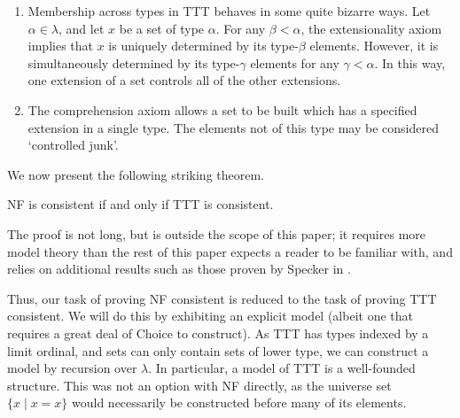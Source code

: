 \begin{remarks}\mbox{\negthinspace}
	\begin{enumerate}
		\item Membership across types in TTT behaves in some quite bizarre ways.
		Let \( \alpha \in \lambda \), and let \( x \) be a set of type \( \alpha \).
		For any \( \beta < \alpha \), the extensionality axiom implies that \( x \) is uniquely determined by its type-\( \beta \) elements.
		However, it is simultaneously determined by its type-\( \gamma \) elements for any \( \gamma < \alpha \).
		In this way, one extension of a set controls all of the other extensions.
		\item The comprehension axiom allows a set to be built which has a specified extension in a single type.
		The elements not of this type may be considered `controlled junk'.
	\end{enumerate}
\end{remarks}

We now present the following striking theorem.

\begin{theorem}[Holmes]
	NF is consistent if and only if TTT is consistent.
\end{theorem}

The proof is not long, but is outside the scope of this paper; it requires more model theory than the rest of this paper expects a reader to be familiar with, and relies on additional results such as those proven by Specker in \cite{typical-ambiguity}.

Thus, our task of proving NF consistent is reduced to the task of proving TTT consistent.
We will do this by exhibiting an explicit model (albeit one that requires a great deal of Choice to construct).
As TTT has types indexed by a limit ordinal, and sets can only contain sets of lower type, we can construct a model by recursion over \( \lambda \).
In particular, a model of TTT is a well-founded structure.
This was not an option with NF directly, as the universe set \( \{ x \mid x = x \} \) would necessarily be constructed before many of its elements.
